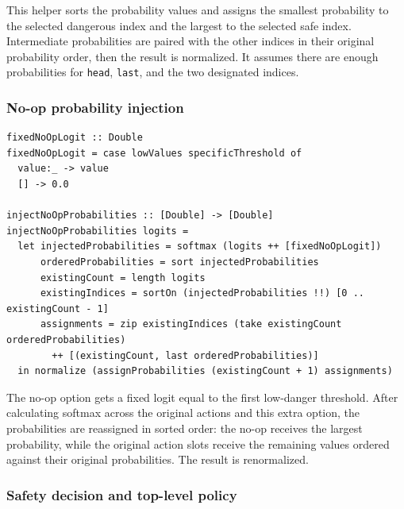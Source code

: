 \documentclass[11pt]{article}
\begin{document}
This helper sorts the probability values and assigns the smallest probability
to the selected dangerous index and the largest to the selected safe index.
Intermediate probabilities are paired with the other indices in their
original probability order, then the result is normalized. It assumes there
are enough probabilities for \texttt{head}, \texttt{last}, and the two
designated indices.

\subsubsection{No-op probability injection}

\begin{lstlisting}
fixedNoOpLogit :: Double
fixedNoOpLogit = case lowValues specificThreshold of
  value:_ -> value
  [] -> 0.0

injectNoOpProbabilities :: [Double] -> [Double]
injectNoOpProbabilities logits =
  let injectedProbabilities = softmax (logits ++ [fixedNoOpLogit])
      orderedProbabilities = sort injectedProbabilities
      existingCount = length logits
      existingIndices = sortOn (injectedProbabilities !!) [0 .. existingCount - 1]
      assignments = zip existingIndices (take existingCount orderedProbabilities)
        ++ [(existingCount, last orderedProbabilities)]
  in normalize (assignProbabilities (existingCount + 1) assignments)
\end{lstlisting}

The no-op option gets a fixed logit equal to the first low-danger threshold.
After calculating softmax across the original actions and this extra option,
the probabilities are reassigned in sorted order: the no-op receives the
largest probability, while the original action slots receive the remaining
values ordered against their original probabilities. The result is
renormalized.

\subsubsection{Safety decision and top-level policy}
\end{document}
